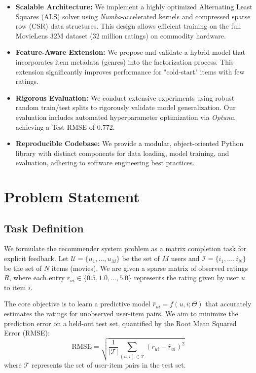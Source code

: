 \documentclass{article}
\theoremstyle{plain}
\theoremstyle{definition}
\theoremstyle{remark}
\begin{document}
\begin{itemize}
    \item \textbf{Scalable Architecture:} We implement a highly optimized Alternating Least Squares (ALS) solver using \textit{Numba}-accelerated kernels and compressed sparse row (CSR) data structures. This design allows efficient training on the full MovieLens 32M dataset (32 million ratings) on commodity hardware.
    \item \textbf{Feature-Aware Extension:} We propose and validate a hybrid model that incorporates item metadata (genres) into the factorization process. This extension significantly improves performance for "cold-start" items with few ratings.
    \item \textbf{Rigorous Evaluation:} We conduct extensive experiments using robust random train/test splits to rigorously validate model generalization. Our evaluation includes automated hyperparameter optimization via \textit{Optuna}, achieving a Test RMSE of 0.772.
    \item \textbf{Reproducible Codebase:} We provide a modular, object-oriented Python library with distinct components for data loading, model training, and evaluation, adhering to software engineering best practices.
\end{itemize}

\section{Problem Statement} %

\subsection{Task Definition}
We formulate the recommender system problem as a matrix completion task for explicit feedback. Let $\mathcal{U} = \{u_1, \dots, u_M\}$ be the set of $M$ users and $\mathcal{I} = \{i_1, \dots, i_N\}$ be the set of $N$ items (movies). We are given a sparse matrix of observed ratings $R$, where each entry $r_{ui} \in \{0.5, 1.0, \dots, 5.0\}$ represents the rating given by user $u$ to item $i$.

The core objective is to learn a predictive model $\hat{r}_{ui} = f(u, i; \Theta)$ that accurately estimates the ratings for unobserved user-item pairs. We aim to minimize the prediction error on a held-out test set, quantified by the Root Mean Squared Error (RMSE):
\begin{equation}
    \text{RMSE} = \sqrt{\frac{1}{|\mathcal{T}|} \sum_{(u,i) \in \mathcal{T}} (r_{ui} - \hat{r}_{ui})^2}
\end{equation}
where $\mathcal{T}$ represents the set of user-item pairs in the test set.
\end{document}
